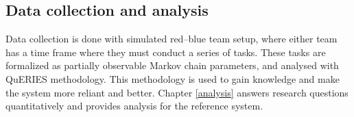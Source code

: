 \subsection{Data collection and analysis}

Data collection is done with simulated red–blue team setup, where either team has a time frame where they must conduct a series of tasks. These tasks are formalized as partially observable Markov chain parameters, and analysed with QuERIES methodology. This methodology is used to gain knowledge and make the system more reliant and better. Chapter \ref{analysis} answers research questions quantitatively and provides analysis for the reference system.
















